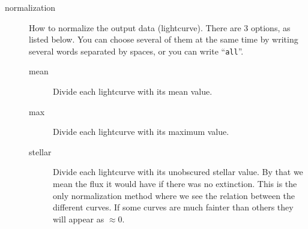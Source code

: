 \documentclass[a4paper, 12pt, english, titlepage]{article}
\begin{document}
\begin{description}
        \item[normalization]
            How to normalize the output data (lightcurve). There are 3 options, as listed below. You can choose several of them at the same time by writing several words separated by spaces, or you can write ``\texttt{all}''.
            \begin{description}
                \item[mean]
                    Divide each lightcurve with its mean value.
                \item[max]
                    Divide each lightcurve with its maximum value.
                \item[stellar]
                    Divide each lightcurve with its unobscured stellar value. By that we mean the flux it would have if there was no extinction. This is the only normalization method where we see the relation between the different curves. If some curves are much fainter than others they will appear as $\approx 0$.
            \end{description}


\end{description}
\end{document}
